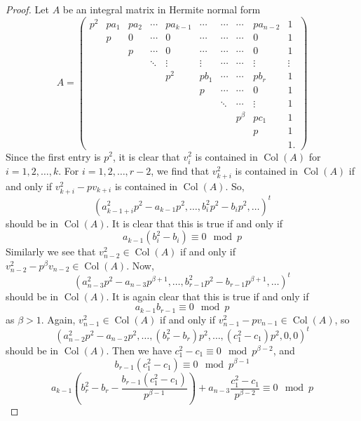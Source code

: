 \documentclass[10pt,a4paper]{amsart}
\newcommand{\op}[1]{\operatorname{#1}}
\begin{document}
\begin{proof}
 Let $A$ be an integral matrix in Hermite normal form \[A=\begin{pmatrix}
	 p^{2}& p a_1 & pa_2 & \cdots & pa_{k-1}& \cdots & \cdots &\cdots& p a_{n-2} & 1 \\
	& p & 0 & \cdots & 0 &  \cdots & \cdots &\cdots& 0 & 1\\
	&& p & \cdots & 0 & \cdots &  \cdots &\cdots& 0  & 1\\
	&&& \ddots & \vdots& \vdots & \cdots &\cdots& \vdots & \vdots\\
	&&&& p^{2} & p b_1 & \cdots &\cdots& p b_r & 1\\
    &&&&  & p & \cdots &\cdots& 0 & 1\\
    	&&&&& & \ddots &\cdots& \vdots & 1\\
	&&&&&&& p^{\beta} & p c_1 & 1\\
	&&&&&&&&p&1\\
	&&&&&&&&&1.
	\end{pmatrix}\]
Since the first entry is $p^2$, it is clear that $v_i^2$ is contained in $\op{Col}(A)$ for $i=1,2,\dots,k$. For $i = 1,2,\dots,r-2$, we find that $v_{k+i}^2$ is contained in $\op{Col}(A)$ if and only if $v_{k+i}^2-pv_{k+i}$ is contained in $\op{Col}(A)$. So,
\[(a_{k-1+i}^2p^2-a_{k-1}p^2,\dots,b_i^2p^2-b_ip^2,\dots)^t\]
should be in $\op{Col}(A)$. It is clear that this is true if and only if
\begin{equation}
    a_{k-1}(b_i^2-b_i) \equiv 0 \mod{p}
\end{equation}
Similarly we see that $v_{n-2}^2 \in \op{Col}(A)$ if and only if $v_{n-2}^2 - p^{\beta}v_{n-2} \in \op{Col}(A)$. Now,
\[(a_{n-3}^2p^2-a_{n-3}p^{\beta+1},\dots,b_{r-1}^2p^2-b_{r-1}p^{\beta+1},\dots)^t\]
should be in $\op{Col}(A)$. It is again clear that this is true if and only if
\begin{equation}
    a_{k-1}b_{r-1} \equiv 0 \mod p
\end{equation}
as $\beta > 1$. Again, $v_{n-1}^2 \in \op{Col}(A)$ if and only if $v_{n-1}^2 - pv_{n-1} \in \op{Col}(A)$, so
\[(a_{n-2}^2p^2-a_{n-2}p^2,\dots,(b_r^2-b_r)p^2,\dots,(c_1^2-c_1)p^2, 0, 0)^t\]
should be in $\op{Col}(A)$. Then we have $c_1^2-c_1 \equiv 0 \mod p^{\beta-2}$, and
\begin{equation}
 b_{r-1}(c_1^2-c_1) \equiv 0 \mod p^{\beta-1}
 \end{equation}
 \begin{equation}
 a_{k-1}\left(b_r^2-b_r-\frac{b_{r-1}(c_1^2-c_1)}{p^{\beta-1}}\right)+a_{n-3}\frac{c_1^2-c_1}{p^{\beta-2}} \equiv 0 \mod p

\end{equation}
\end{proof}
\end{document}
